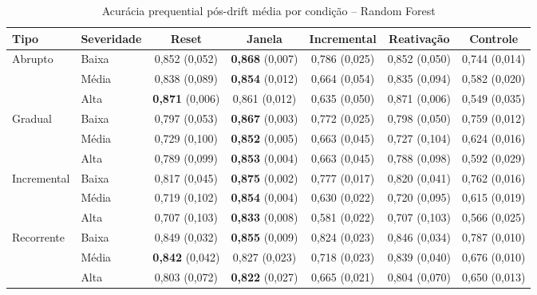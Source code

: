 \begin{table}[htbp]
\centering
\small
\caption{Acurácia prequential pós-drift média por condição -- Random Forest}
\label{tab:acc-randomforest}
\begin{adjustbox}{max width=\textwidth}
\begin{tabular}{llccccc}
\toprule
Tipo & Severidade & Reset & Janela & Incremental & Reativação & Controle \\
\midrule
Abrupto & Baixa & 0,852 (0,052) & \textbf{0,868} (0,007) & 0,786 (0,025) & 0,852 (0,050) & 0,744 (0,014) \\
 & Média & 0,838 (0,089) & \textbf{0,854} (0,012) & 0,664 (0,054) & 0,835 (0,094) & 0,582 (0,020) \\
 & Alta & \textbf{0,871} (0,006) & 0,861 (0,012) & 0,635 (0,050) & 0,871 (0,006) & 0,549 (0,035) \\
Gradual & Baixa & 0,797 (0,053) & \textbf{0,867} (0,003) & 0,772 (0,025) & 0,798 (0,050) & 0,759 (0,012) \\
 & Média & 0,729 (0,100) & \textbf{0,852} (0,005) & 0,663 (0,045) & 0,727 (0,104) & 0,624 (0,016) \\
 & Alta & 0,789 (0,099) & \textbf{0,853} (0,004) & 0,663 (0,045) & 0,788 (0,098) & 0,592 (0,029) \\
Incremental & Baixa & 0,817 (0,045) & \textbf{0,875} (0,002) & 0,777 (0,017) & 0,820 (0,041) & 0,762 (0,016) \\
 & Média & 0,719 (0,102) & \textbf{0,854} (0,004) & 0,630 (0,022) & 0,720 (0,095) & 0,615 (0,019) \\
 & Alta & 0,707 (0,103) & \textbf{0,833} (0,008) & 0,581 (0,022) & 0,707 (0,103) & 0,566 (0,025) \\
Recorrente & Baixa & 0,849 (0,032) & \textbf{0,855} (0,009) & 0,824 (0,023) & 0,846 (0,034) & 0,787 (0,010) \\
 & Média & \textbf{0,842} (0,042) & 0,827 (0,023) & 0,718 (0,023) & 0,839 (0,040) & 0,676 (0,010) \\
 & Alta & 0,803 (0,072) & \textbf{0,822} (0,027) & 0,665 (0,021) & 0,804 (0,070) & 0,650 (0,013) \\
\bottomrule
\end{tabular}
\end{adjustbox}
\par\vspace{2pt}{\footnotesize Média e, entre parênteses, desvio-padrão de 10 repetições. Em negrito, a melhor média de cada linha (excluído o controle).}
\end{table}
